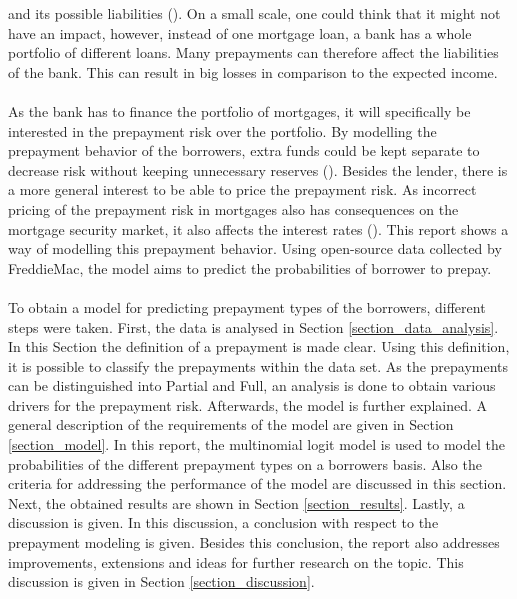 and its possible liabilities (\cite{jacobs2005modelling}). 
On a small scale, one could think that it might not have an impact, however, instead of one 
mortgage loan, a bank has a whole portfolio of different loans. 
Many prepayments can therefore affect the liabilities of the bank. This 
can result in big losses in comparison to the expected income.  
\\\\
As the bank has to finance the portfolio of mortgages, it will
specifically be interested in the prepayment risk over the portfolio.
By modelling the prepayment behavior of the borrowers, extra funds could be 
kept separate to decrease risk without keeping unnecessary 
reserves (\cite{jacobs2005modelling}).
Besides the lender, there is a more general interest to be able 
to price the prepayment risk. As incorrect pricing of the prepayment risk 
in mortgages also has consequences on the mortgage security market, it also 
affects the interest rates (\cite{Chinloy1989}).  
This report shows a way of modelling this prepayment behavior. 
Using open-source data collected by FreddieMac, the model aims to predict 
the probabilities of borrower to prepay. 
\\\\
To obtain a model for predicting prepayment types of the borrowers, 
different steps were taken.
First, the data is analysed in Section \ref{section_data_analysis}. In 
this Section the definition of a prepayment is made clear. Using this 
definition, it is possible to classify the prepayments within the data set. 
As the prepayments can be distinguished into Partial and Full, an analysis is done to obtain 
various drivers for the prepayment risk. Afterwards, the model is further 
explained. A general description of the requirements of the model are given in 
Section \ref{section_model}. In this report, the multinomial logit 
model is used to model the probabilities of the different prepayment types on a borrowers basis. Also the criteria 
for addressing the performance of the model are discussed in this section.   
Next, the obtained results are shown in Section \ref{section_results}. Lastly, 
a discussion is given. In this discussion, a conclusion with respect to the 
prepayment modeling is given. Besides this conclusion, the report also addresses 
improvements, extensions and ideas for further research on the topic. 
This discussion is given in Section \ref{section_discussion}.
\\\\
